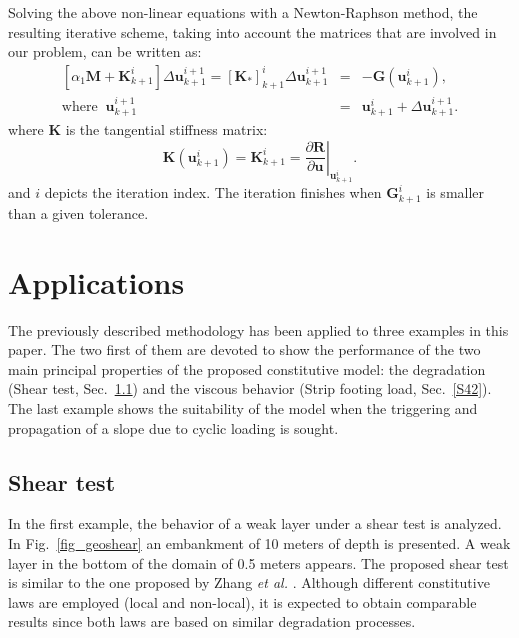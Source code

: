 \documentclass[applsci,journal,article,submit,moreauthors,pdftex]{Definitions/mdpi}
\begin{document}
Solving the above non-linear equations with a Newton-Raphson method, the resulting iterative scheme, taking into account the matrices that are involved in our problem, can be written as:
\begin{eqnarray}\label{eq_uw32}
\left[\alpha_1\boldsymbol {M}+\boldsymbol {K}^{i}_{k+1}\right]\Delta\boldsymbol{u}^{i+1}_{k+1} = \left[\boldsymbol {K_{*}}\right]^{i}_{k+1} \Delta\boldsymbol{u}^{i+1}_{k+1} &=& -\boldsymbol {G}(\boldsymbol {u}^{i}_{k+1}), \\
\mbox{where}\;\; \boldsymbol {u}^{i+1}_{k+1} &=& \boldsymbol {u}^{i}_{k+1} + \Delta \boldsymbol {u}^{i+1}_{k+1}.  \nonumber 
\end{eqnarray}
where $\boldsymbol {K}$ is the tangential stiffness matrix:
\begin{equation}\label{eq_uw31}
\boldsymbol {K}(\boldsymbol {u}^{i}_{k+1})=\boldsymbol {K}^{i}_{k+1}=\left.\frac{\partial\boldsymbol {R}}{\partial \boldsymbol {u}}\right|_{\boldsymbol{u}^{i}_{k+1}}.
\end{equation}
and $i$ depicts the iteration index. The iteration finishes when  $\boldsymbol {G}^{i}_{k+1}$ is smaller than a given tolerance.

\section{Applications}
\label{S4}
The previously described methodology has been applied to three examples in this paper. The two first of them are devoted to show the performance of the two main principal properties of the proposed constitutive model: the degradation (Shear test, Sec.~\ref{S41}) and the viscous behavior (Strip footing load, Sec.~\ref{S42}). The last example shows the suitability of the model when the triggering and propagation of a slope due to cyclic loading is sought.

\subsection{Shear test}
\label{S41}
In the first example, the behavior of a weak layer under a shear test is analyzed. In Fig.~\ref{fig_geoshear} an embankment of 10 meters of depth is presented. A weak layer in the bottom of the domain of 0.5 meters appears. The proposed shear test is similar to the one proposed by Zhang \textit{et al.} \cite{Zhang2015}. Although different constitutive laws are employed (local and non-local), it is expected to obtain comparable results since both laws are based on similar degradation processes.
\end{document}
